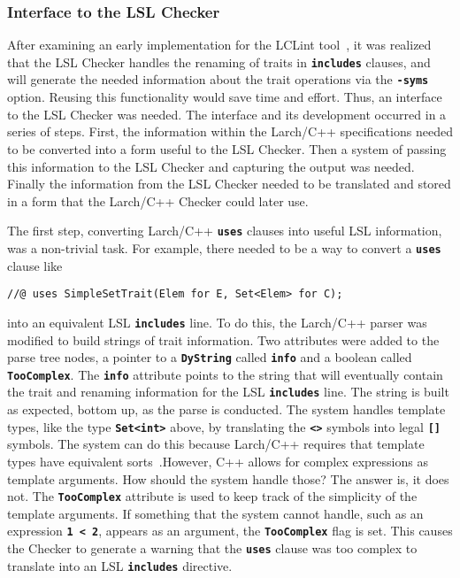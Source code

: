 \documentclass[12pt]{article} %
\newcommand{\reserved}[1]{\textbf{\texttt{#1}}} %
\begin{document}
\subsubsection{Interface to the LSL Checker}
\label{lslinterf}
After examining an early implementation for the LCLint
tool~\cite{lclint}, it was realized that the LSL Checker handles the
renaming of traits in
\reserved{includes} clauses, and will generate the needed information
about the trait operations via the \reserved{-syms} option. Reusing
this functionality would save time and effort. Thus, an interface to
the LSL Checker was needed. The interface and its development occurred
in a series of steps. First, the information within the Larch/C++
specifications needed to be converted into a form useful to the LSL
Checker. Then a system of passing this information to the LSL Checker
and capturing the output was needed. Finally the information from the
LSL Checker needed to be translated and stored in a form that the
Larch/C++ Checker could later use.

The first step, converting Larch/C++ \reserved{uses} clauses into useful LSL
information, was a non-trivial task. For example, there needed to be a
way to convert a \reserved{uses} clause like 
\begin{verbatim}
//@ uses SimpleSetTrait(Elem for E, Set<Elem> for C);
\end{verbatim}
into an equivalent LSL \reserved{includes} line. To do this, the
Larch/C++ parser was modified to build strings of trait
information. Two attributes were added to the parse tree nodes, a
pointer to a
\reserved{DyString} called \reserved{info} and a boolean called
\reserved{TooComplex}. The \reserved{info} attribute points to the
string that will eventually contain the trait and renaming information
for the LSL \reserved{includes} line. The string is built as expected,
bottom up, as the parse is conducted. The system handles template
types, like the type \reserved{Set<int>} above, by translating the
\reserved{<>} symbols into legal \reserved{[]} symbols. The system can
do this because Larch/C++ requires that template types have equivalent
sorts~\cite[Page 20]{Leavens96c}.However, C++ allows for complex
expressions as template arguments. How should the system handle those?
The answer is, it does not. The \reserved{TooComplex} attribute is
used to keep track of the simplicity of the template arguments. If
something that the system cannot handle, such as an expression
\reserved{1 < 2}, appears as an argument, the \reserved{TooComplex}
flag is set. This causes the Checker to generate a warning that the
\reserved{uses} clause was too complex to translate into an LSL
\reserved{includes} directive.
\end{document}
